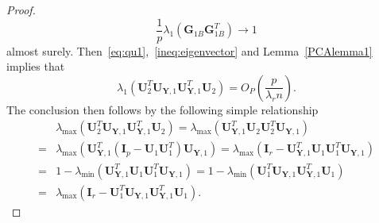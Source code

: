 \documentclass[12pt]{article} %
\newcommand{\bY}{\mathbf{Y}}
\newcommand{\bG}{\mathbf{G}}
\newcommand{\bI}{\mathbf{I}}
\newcommand{\bU}{\mathbf{U}}
\theoremstyle{definition}
\begin{document}
\begin{proof}
    \begin{equation}\label{eq:qu1}
    \frac{1}{p}\lambda_1(\bG_{1B}\bG_{1B}^T)\to 1
    \end{equation}
    almost surely.
    Then~\eqref{eq:qu1},~\eqref{ineq:eigenvector} and Lemma~\ref{PCAlemma1} implies that
    $$\lambda_{1}(\bU_{2}^T \bU_{\bY,1} \bU_{\bY,1}^T \bU_{2})=O_P(\frac{p}{\lambda_r n}).
    $$
 The conclusion then follows by the following simple relationship
$$
\begin{aligned}
&\lambda_{\max}(\bU_{2}^T \bU_{\bY,1} \bU_{\bY,1}^T \bU_{2})
=
\lambda_{\max}(\bU_{\bY,1}^T \bU_{2} \bU_{2}^T \bU_{\bY,1})\\
=&
    \lambda_{\max}(\bU_{\bY,1}^T (\bI_p-\bU_{1} \bU_{1}^T) \bU_{\bY,1})
    =
\lambda_{\max}(\bI_r-\bU_{\bY,1}^T\bU_{1} \bU_{1}^T \bU_{\bY,1})\\
=&
1-\lambda_{\min}(\bU_{\bY,1}^T\bU_{1} \bU_{1}^T \bU_{\bY,1})
=
1-\lambda_{\min}( \bU_{1}^T \bU_{\bY,1}\bU_{\bY,1}^T\bU_{1})\\
=&
\lambda_{\max}(\bI_r-\bU_{1}^T \bU_{\bY,1}\bU_{\bY,1}^T\bU_{1}).
\end{aligned}
$$
\end{proof}
\end{document}
